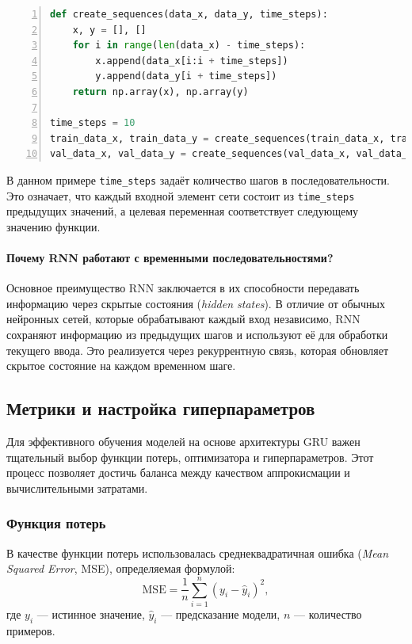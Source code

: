 \begin{lstlisting}[language=Python, breaklines, caption=Создание временных последовательностей,numbers=left]
def create_sequences(data_x, data_y, time_steps):
    x, y = [], []
    for i in range(len(data_x) - time_steps):
        x.append(data_x[i:i + time_steps])
        y.append(data_y[i + time_steps])
    return np.array(x), np.array(y)

time_steps = 10
train_data_x, train_data_y = create_sequences(train_data_x, train_data_y, time_steps)
val_data_x, val_data_y = create_sequences(val_data_x, val_data_y, time_steps)
\end{lstlisting}

В данном примере \texttt{time\_steps} задаёт количество шагов в последовательности. Это означает, что каждый входной элемент сети состоит из \texttt{time\_steps} предыдущих значений, а целевая переменная соответствует следующему значению функции.

\paragraph{Почему RNN работают с временными последовательностями?}
Основное преимущество RNN заключается в их способности передавать информацию через скрытые состояния (\textit{hidden states}). В отличие от обычных нейронных сетей, которые обрабатывают каждый вход независимо, RNN сохраняют информацию из предыдущих шагов и используют её для обработки текущего ввода. Это реализуется через рекуррентную связь, которая обновляет скрытое состояние на каждом временном шаге.



\subsection{Метрики и настройка гиперпараметров}
\label{subsec:metrics}

Для эффективного обучения моделей на основе архитектуры GRU важен тщательный выбор функции потерь, оптимизатора и гиперпараметров. Этот процесс позволяет достичь баланса между качеством аппрокисмации и вычислительными затратами.

\subsubsection{Функция потерь}

В качестве функции потерь использовалась среднеквадратичная ошибка (\textit{Mean Squared Error}, MSE), определяемая формулой:
\[
\text{MSE} = \frac{1}{n} \sum_{i=1}^{n} (y_i - \hat{y}_i)^2,
\]
где \( y_i \) — истинное значение, \( \hat{y}_i \) — предсказание модели, \( n \) — количество примеров.

